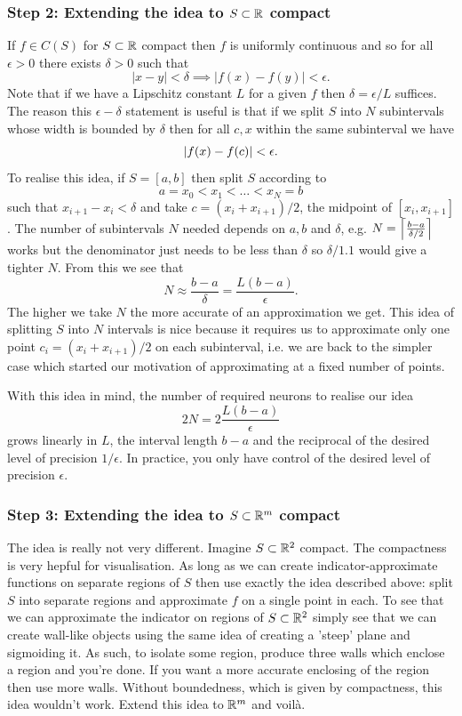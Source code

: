 \documentclass[11pt]{article}
\begin{document}
\subsubsection*{Step 2: Extending the idea to $S\subset\mathbb{R}$ compact}
If $f\in C(S)$ for $S\subset\mathbb{R}$ compact then $f$ is uniformly continuous and so for all $\epsilon>0$ there exists $\delta>0$ such that
$$
|x-y|<\delta\implies|f(x)-f(y)|<\epsilon.
$$
Note that if we have a Lipschitz constant $L$ for a given $f$ then $\delta=\epsilon/L$ suffices. The reason this $\epsilon-\delta$ statement is useful is that if we split $S$ into $N$ subintervals whose width is bounded by $\delta$ then for all $c,x$ within the same subinterval we have
$$
\left|f(x)-f(c)\right|<\epsilon.
$$
To realise this idea, if $S=[a,b]$ then split $S$ according to
$$
a=x_0<x_1<\dots<x_N=b
$$
such that $x_{i+1}-x_i<\delta$ and take $c=(x_i+x_{i+1})/2$, the midpoint of $[x_i,x_{i+1}]$. The number of subintervals $N$ needed depends on $a,b$ and $\delta$, e.g. $N=\left\lceil\frac{b-a}{\delta/2}\right\rceil$ works but the denominator just needs to be less than $\delta$ so $\delta/1.1$ would give a tighter $N$. From this we see that
$$
N
\approx
\frac{b-a}{\delta}
=
\frac{L(b-a)}{\epsilon}.
$$
The higher we take $N$ the more accurate of an approximation we get. This idea of splitting $S$ into $N$ intervals is nice because it requires us to approximate only one point $c_i=(x_i+x_{i+1})/2$ on each subinterval, i.e. we are back to the simpler case which started our motivation of approximating at a fixed number of points.

With this idea in mind, the number of required neurons to realise our idea
$$
2N
=
2\frac{L(b-a)}{\epsilon}
$$
grows linearly in $L$, the interval length $b-a$ and the reciprocal of the desired level of precision $1/\epsilon$. In practice, you only have control of the desired level of precision $\epsilon$.

\subsubsection*{Step 3: Extending the idea to $S\subset\mathbb{R}^m$ compact}
The idea is really not very different. Imagine $S\subset\mathbb{R}^2$ compact. The compactness is very hepful for visualisation. As long as we can create indicator-approximate functions on separate regions of $S$ then use exactly the idea described above: split $S$ into separate regions and approximate $f$ on a single point in each. To see that we can approximate the indicator on regions of $S\subset\mathbb{R}^2$ simply see that we can create wall-like objects using the same idea of creating a 'steep' plane and sigmoiding it. As such, to isolate some region, produce three walls which enclose a region and you're done. If you want a more accurate enclosing of the region then use more walls. Without boundedness, which is given by compactness, this idea wouldn't work. Extend this idea to $\mathbb{R}^m$ and voilà.
\end{document}
